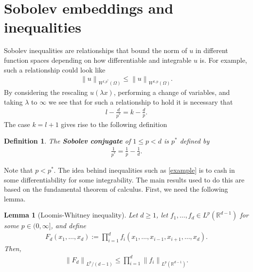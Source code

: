\documentclass[12pt]{article}
\newtheorem{lemma}{Lemma}
\newtheorem{definition}{Definition}
\theoremstyle{remark}
\renewcommand{\norm}[1]{\left\lVert #1 \right\rVert}\renewcommand{\abs}[1]{\left| #1 \right|}
\begin{document}
\section{Sobolev embeddings and inequalities}
Sobolev inequalities are relationships that bound the norm of $u$ in different function spaces depending on how differentiable and integrable $u$ is. For example, such a relationship could look like
\begin{align}\label{example}
	\norm{u}_{W^{ l,p^* }(\Omega)}\leq \norm{u}_{W^{k,p}(\Omega)}.
\end{align}
By considering the rescaling $u(\lambda x)$, performing a change of variables, and taking $\lambda $ to $\infty$ we see that for such a relationship to hold it is necessary that
\begin{align}\label{conjugate}
	l-     \frac{d}{p^*}=k-\frac{d}{p}  .
\end{align}
The case $k=l+1$ gives rise to the following definition
\begin{definition}
	The \textbf{Sobolev conjugate } of $1\leq p<d$ is $p^*$ defined by
	\begin{align*}
		\frac{1}{p^*}= \frac{1}{p} -\frac{1}{d} .
	\end{align*}
\end{definition}
Note that $p<p^*$. The idea behind inequalities such as \eqref{example}  is to cash in some differentiability for some integrability. The main results used to do this are based on the fundamental theorem of calculus. First, we need the following lemma.
\begin{lemma}[Loomis-Whitney inequality]\label{whitney} Let $d \geq 1$, let $f_1, \ldots, f_d \in L^p\left(\mathbb{R}^{d-1}\right)$ for some $p \in (0,\infty]$, and define
	\begin{align*}
		F_d\left(x_1, \ldots, x_d\right):=\prod_{i=1}^d f_i\left(x_1, \ldots, x_{i-1}, x_{i+1}, \ldots, x_d\right).
	\end{align*}
	Then,
	\begin{align}\label{loomis ineq}
		\norm{F_d}_{L^{p}/({d-1})}\leq\prod_{i=1}^d\left\|f_i\right\|_{L^p\left(\mathbb{R}^{d-1}\right)} .
	\end{align}
\end{lemma}
\end{document}
